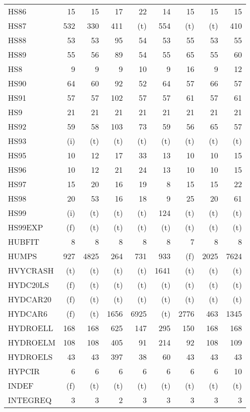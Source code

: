 \documentclass[11pt,twoside]{article}
\begin{document}
{\begin{longtable}[c]{|l|r|r|r|r|r|r|r|r|}
 HS86 & 15 & 15 & 17 & 22 & 14 & 15 & 15 & 15 \\
 HS87 & 532 & 330 & 411 & (t) & 554 & (t) & (t) & 410 \\
 HS88 & 53 & 53 & 95 & 54 & 53 & 55 & 53 & 55 \\
 HS89 & 55 & 56 & 89 & 54 & 55 & 65 & 55 & 60 \\
 HS8 & 9 & 9 & 9 & 10 & 9 & 16 & 9 & 12 \\
 HS90 & 64 & 60 & 92 & 52 & 64 & 57 & 66 & 57 \\
 HS91 & 57 & 57 & 102 & 57 & 57 & 61 & 57 & 61 \\
 HS9 & 21 & 21 & 21 & 21 & 21 & 21 & 21 & 21 \\
 HS92 & 59 & 58 & 103 & 73 & 59 & 56 & 65 & 57 \\
 HS93 & (i) & (t) & (t) & (t) & (t) & (t) & (t) & (t) \\
 HS95 & 10 & 12 & 17 & 33 & 13 & 10 & 10 & 15 \\
 HS96 & 10 & 12 & 21 & 24 & 13 & 10 & 10 & 15 \\
 HS97 & 15 & 20 & 16 & 19 & 8 & 15 & 15 & 22 \\
 HS98 & 20 & 53 & 16 & 18 & 9 & 25 & 20 & 61 \\
 HS99 & (i) & (t) & (t) & (t) & 124 & (t) & (t) & (t) \\
 HS99EXP & (f) & (t) & (t) & (t) & (t) & (t) & (t) & (t) \\
 HUBFIT & 8 & 8 & 8 & 8 & 8 & 7 & 8 & 8 \\
 HUMPS & 927 & 4825 & 264 & 731 & 933 & (f) & 2025 & 7624 \\
 HVYCRASH & (t) & (t) & (t) & (t) & 1641 & (t) & (t) & (t) \\
 HYDC20LS & (f) & (t) & (t) & (t) & (t) & (t) & (t) & (t) \\
 HYDCAR20 & (f) & (t) & (t) & (t) & (t) & (t) & (t) & (t) \\
 HYDCAR6 & (f) & (t) & 1656 & 6925 & (t) & 2776 & 463 & 1345 \\
 HYDROELL & 168 & 168 & 625 & 147 & 295 & 150 & 168 & 168 \\
 HYDROELM & 108 & 108 & 405 & 91 & 214 & 92 & 108 & 109 \\
 HYDROELS & 43 & 43 & 397 & 38 & 60 & 43 & 43 & 43 \\
 HYPCIR & 6 & 6 & 6 & 6 & 6 & 6 & 6 & 10 \\
 INDEF & (f) & (t) & (t) & (t) & (t) & (t) & (t) & (t) \\
 INTEGREQ & 3 & 3 & 2 & 3 & 3 & 3 & 3 & 3 \\

\end{longtable}}
\end{document}
